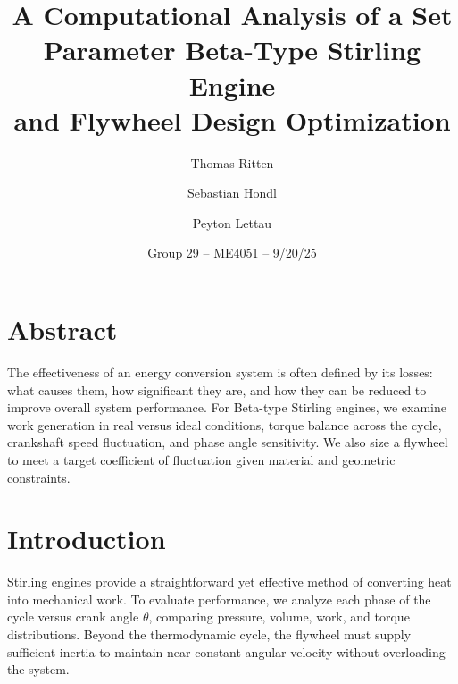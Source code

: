 \documentclass[12pt]{article}
\title{A Computational Analysis of a Set Parameter Beta-Type Stirling Engine\\and Flywheel Design Optimization}
\author{Thomas Ritten \and Sebastian Hondl \and Peyton Lettau}
\date{Group 29 -- ME4051 -- 9/20/25}
\begin{document}
\maketitle
\section*{Abstract}
The effectiveness of an energy conversion system is often defined by its losses: what causes them, how significant they are, and how they can be reduced to improve overall system performance. For Beta-type Stirling engines, we examine work generation in real versus ideal conditions, torque balance across the cycle, crankshaft speed fluctuation, and phase angle sensitivity. We also size a flywheel to meet a target coefficient of fluctuation given material and geometric constraints.

\section{Introduction}
Stirling engines provide a straightforward yet effective method of converting heat into mechanical work. To evaluate performance, we analyze each phase of the cycle versus crank angle \(\theta\), comparing pressure, volume, work, and torque distributions. Beyond the thermodynamic cycle, the flywheel must supply sufficient inertia to maintain near-constant angular velocity without overloading the system.
\end{document}
